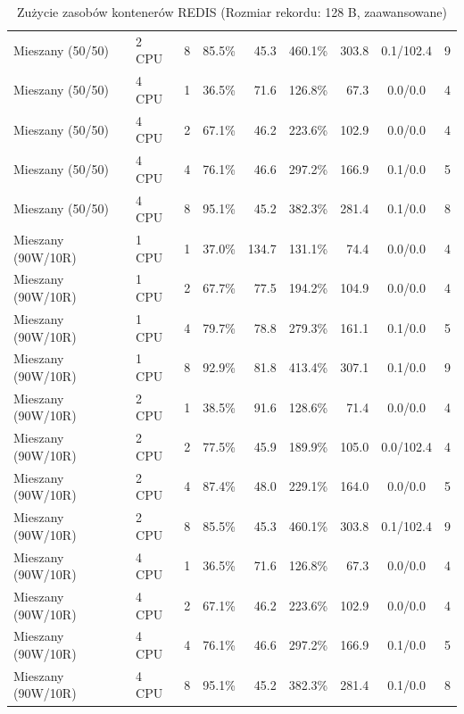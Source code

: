 \begin{table}[ht]
{\begin{tabular}{llcrrrrcc}
Mieszany (50/50) & 2 CPU & 8 & 85.5\% & 45.3 & 460.1\% & 303.8 & 0.1/102.4 & 9 \\
Mieszany (50/50) & 4 CPU & 1 & 36.5\% & 71.6 & 126.8\% & 67.3 & 0.0/0.0 & 4 \\
Mieszany (50/50) & 4 CPU & 2 & 67.1\% & 46.2 & 223.6\% & 102.9 & 0.0/0.0 & 4 \\
Mieszany (50/50) & 4 CPU & 4 & 76.1\% & 46.6 & 297.2\% & 166.9 & 0.1/0.0 & 5 \\
Mieszany (50/50) & 4 CPU & 8 & 95.1\% & 45.2 & 382.3\% & 281.4 & 0.1/0.0 & 8 \\
Mieszany (90W/10R) & 1 CPU & 1 & 37.0\% & 134.7 & 131.1\% & 74.4 & 0.0/0.0 & 4 \\
Mieszany (90W/10R) & 1 CPU & 2 & 67.7\% & 77.5 & 194.2\% & 104.9 & 0.0/0.0 & 4 \\
Mieszany (90W/10R) & 1 CPU & 4 & 79.7\% & 78.8 & 279.3\% & 161.1 & 0.1/0.0 & 5 \\
Mieszany (90W/10R) & 1 CPU & 8 & 92.9\% & 81.8 & 413.4\% & 307.1 & 0.1/0.0 & 9 \\
Mieszany (90W/10R) & 2 CPU & 1 & 38.5\% & 91.6 & 128.6\% & 71.4 & 0.0/0.0 & 4 \\
Mieszany (90W/10R) & 2 CPU & 2 & 77.5\% & 45.9 & 189.9\% & 105.0 & 0.0/102.4 & 4 \\
Mieszany (90W/10R) & 2 CPU & 4 & 87.4\% & 48.0 & 229.1\% & 164.0 & 0.0/0.0 & 5 \\
Mieszany (90W/10R) & 2 CPU & 8 & 85.5\% & 45.3 & 460.1\% & 303.8 & 0.1/102.4 & 9 \\
Mieszany (90W/10R) & 4 CPU & 1 & 36.5\% & 71.6 & 126.8\% & 67.3 & 0.0/0.0 & 4 \\
Mieszany (90W/10R) & 4 CPU & 2 & 67.1\% & 46.2 & 223.6\% & 102.9 & 0.0/0.0 & 4 \\
Mieszany (90W/10R) & 4 CPU & 4 & 76.1\% & 46.6 & 297.2\% & 166.9 & 0.1/0.0 & 5 \\
Mieszany (90W/10R) & 4 CPU & 8 & 95.1\% & 45.2 & 382.3\% & 281.4 & 0.1/0.0 & 8 \\
\bottomrule
\end{tabular}%
}
\caption{Zużycie zasobów kontenerów REDIS (Rozmiar rekordu: 128 B, zaawansowane)}
\label{tab:resources_redis_small_0}
\end{table}
